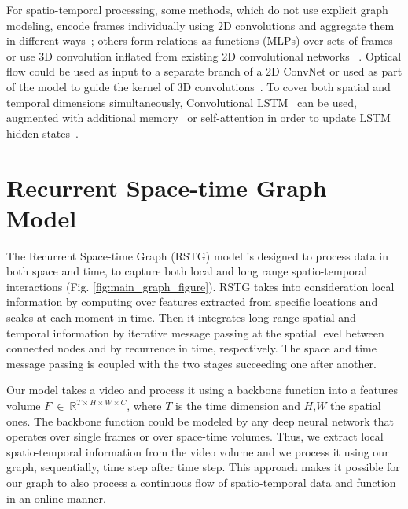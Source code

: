 \documentclass{article}
\begin{document}
For spatio-temporal processing, some methods, which do not use explicit graph modeling, encode frames individually using 2D convolutions and aggregate them in different ways~\cite{karpathy2014large, yue2015beyond, donahue2015long}; others form relations as functions (MLPs) over sets of frames~\cite{zhou2018temporal_trn_torralba} or use 3D convolution inflated from existing 2D convolutional networks~\cite{carreira2017quo} .
Optical flow could be used as input to a separate branch of a 2D ConvNet \cite{simonyan2014two_stream} or used as part of the model to guide the kernel of 3D convolutions~\cite{NIPS2018_7489_trajectory}. To cover both spatial and temporal dimensions simultaneously, Convolutional LSTM~\cite{Shi2015ConvLSTM} can be used, augmented with additional memory~\cite{Wang2017ST-LSTM} or self-attention in order to update LSTM hidden states~\cite{wang2018eidetic}. 

\section{Recurrent Space-time Graph Model}
\label{model_section}
The Recurrent Space-time Graph (RSTG) model is designed to process data in both space and time, to capture both local and long range spatio-temporal interactions (Fig. \ref{fig:main_graph_figure}). RSTG takes into consideration local information by computing over features extracted from specific locations and scales at each moment in time. Then it integrates long range spatial and temporal information by iterative message passing at the spatial level between connected nodes and by recurrence in time, respectively. The space and time message passing is coupled with the two stages succeeding one after another. 

Our model takes a video and process it using a backbone function into a features volume $F~\in~\mathbb{R}^{T\times H \times W \times C}$, where $T$ is the time dimension and $H$,$W$ the spatial ones. The backbone function could be modeled by any deep neural network that operates over single frames or over space-time volumes.
Thus, we extract local spatio-temporal information from the video volume and we process it using our graph, sequentially, time step after time step. This approach makes it possible for our graph to also process a continuous flow of spatio-temporal data and function in an online manner.
\end{document}
